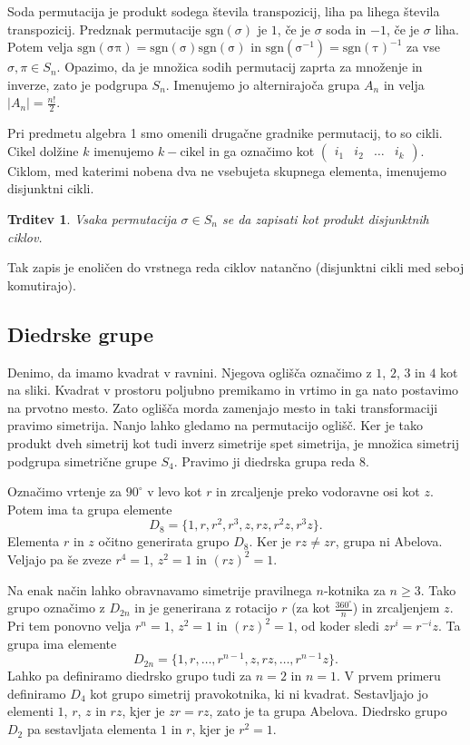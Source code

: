 \documentclass[10pt, a4paper]{article}
\newtheorem{trditev}[izr]{Trditev}
\begin{document}
Soda permutacija je produkt sodega števila transpozicij, liha pa lihega števila transpozicij.
Predznak permutacije $\mathrm{sgn} (\sigma)$ je $1$, če je $\sigma$ soda in $-1$, če je $\sigma$ liha.
Potem velja $\mathrm{sgn(\sigma \pi)} = \mathrm{sgn (\sigma)} \mathrm{sgn (\sigma)}$ in $\mathrm{sgn (\sigma^{-1})}= \mathrm{sgn(\tau)}^{-1}$
za vse $\sigma, \pi \in S_n$. Opazimo, da je množica sodih permutacij zaprta za množenje in inverze, zato je podgrupa $S_n$.
Imenujemo jo alternirajoča grupa $A_n$ in velja $|A_n| = \frac{n!}{2}$.

Pri predmetu algebra 1 smo omenili drugačne gradnike permutacij, to so cikli.
Cikel dolžine $k$ imenujemo $k-$cikel in ga označimo kot $\begin{pmatrix}
  i_1 & i_2 & \dots & i_k
\end{pmatrix}$. Ciklom, med katerimi nobena dva ne vsebujeta skupnega elementa, imenujemo disjunktni cikli.

\begin{trditev}
  Vsaka permutacija $\sigma \in S_n$ se da zapisati kot produkt disjunktnih ciklov.
\end{trditev}

Tak zapis je enoličen do vrstnega reda ciklov natančno (disjunktni cikli med seboj komutirajo).

\subsection{Diedrske grupe}

Denimo, da imamo kvadrat v ravnini. Njegova oglišča označimo z $1$, $2$, $3$ in $4$ kot na sliki.
Kvadrat v prostoru poljubno premikamo in vrtimo in ga nato postavimo na prvotno mesto.
Zato oglišča morda zamenjajo mesto in taki transformaciji pravimo simetrija.
Nanjo lahko gledamo na permutacijo oglišč.
Ker je tako produkt dveh simetrij kot tudi inverz simetrije spet simetrija, je množica 
simetrij podgrupa simetrične grupe $S_4$. Pravimo ji diedrska grupa reda $8$.

Označimo vrtenje za $90^\circ$ v levo kot $r$ in zrcaljenje preko vodoravne osi kot $z$.
Potem ima ta grupa elemente $$D_8 = \{1, r, r^2, r^3, z, rz, r^2z, r^3z\}.$$
Elementa $r$ in $z$ očitno generirata grupo $D_8$. Ker je $rz \neq zr$, grupa ni Abelova.
Veljajo pa še zveze $r^4 = 1$, $z^2 = 1$ in $(rz)^2 =1$.

Na enak način lahko obravnavamo simetrije pravilnega $n$-kotnika za $n \geq 3$.
Tako grupo označimo z $D_{2n}$ in je generirana z rotacijo $r$ (za kot $\frac{360^\circ}{n}$)
in zrcaljenjem $z$.
Pri tem ponovno velja $r^n = 1$, $z^2 = 1$ in $(rz)^2 = 1$, od koder sledi $zr^i = r^{-i} z$.
Ta grupa ima elemente $$D_{2n} = \{1, r, \dots, r^{n - 1}, z, rz, \dots, r^{n-1}z\}.$$
Lahko pa definiramo diedrsko grupo tudi za $n = 2$ in $n = 1$.
V prvem primeru definiramo $D_{4}$ kot grupo simetrij pravokotnika, ki ni kvadrat.
Sestavljajo jo elementi $1$, $r$, $z$ in $rz$, kjer je $zr = rz$, zato je ta grupa Abelova.
Diedrsko grupo $D_2$ pa sestavljata elementa $1$ in $r$, kjer je $r^2 = 1$.
\end{document}
